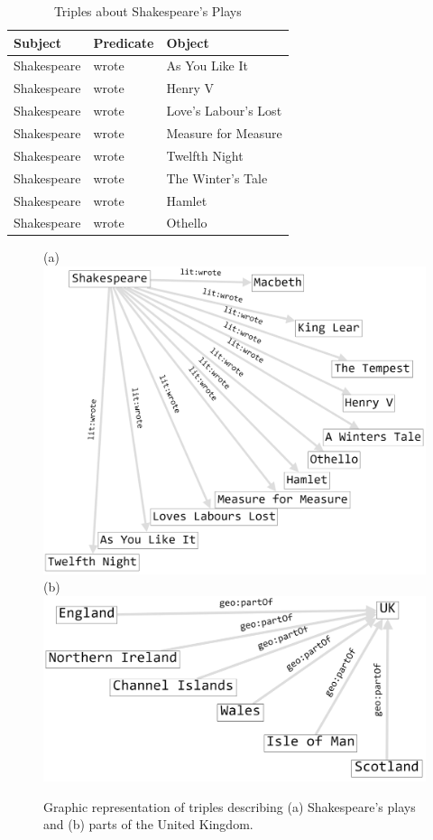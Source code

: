 \begin{table}[h]
\centering
\begin{tabular}{||l l l||} 
 \hline
 Subject&Predicate&Object \\ [0.5ex] 
 \hline\hline
Shakespeare&wrote&As You Like It\\
Shakespeare&wrote&Henry V\\
Shakespeare&wrote&Love's Labour's Lost \\
Shakespeare&wrote&Measure for Measure \\
Shakespeare&wrote&Twelfth Night \\
Shakespeare&wrote&The Winter's Tale \\
Shakespeare&wrote&Hamlet\\
Shakespeare&wrote&Othello\\
\hline
\end{tabular}
\caption{Triples about Shakespeare's Plays}
\label{tab:ch3.4}
\end{table}


\begin{figure}
    \centering
    (a)
    \includegraphics[width=5.0in]{SWWOv3/media/ch3/figure3-5a.png}
    (b)
    \includegraphics[width=5.0in]{SWWOv3/media/ch3/figure3-5b.png}
    \caption{Graphic representation of triples describing (a) Shakespeare’s plays and (b) parts of the United Kingdom.}
    \label{fig:ch3.5}
\end{figure}


